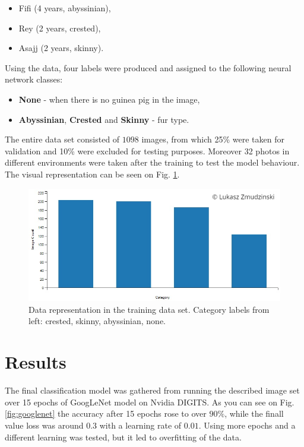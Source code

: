 \documentclass[10pt,journal,compsoc]{IEEEtran}
\begin{document}
    \begin{itemize}
        \item Fifi (4 years, abyssinian),
        \item Rey (2 years, crested),
        \item Asajj (2 years, skinny).
    \end{itemize}

    \noindent Using the data, four labels were produced and assigned to the following neural network classes:

    \begin{itemize}
        \item \textbf{None} - when there is no guinea pig in the image,
        \item \textbf{Abyssinian}, \textbf{Crested} and \textbf{Skinny} - fur type.
    \end{itemize}

    The entire data set consisted of $1098$ images, from which 25\% were taken for validation and 10\% were excluded for testing purposes. Moreover 32 photos in different environments were taken after the training to test the model behaviour. The visual representation can be seen on Fig. \ref{fig:data}.

    \begin{figure}[h]
        \includegraphics[width=\linewidth]{data.png}
        \caption{Data representation in the training data set. Category labels from left: crested, skinny, abyssinian, none.}
        \label{fig:data}
        \centering
    \end{figure}
    
    \section{Results}

    The final classification model was gathered from running the described image set over 15 epochs of GoogLeNet model on Nvidia DIGITS. As you can see on Fig. \ref{fig:googlenet} the accuracy after 15 epochs rose to over $90\%$, while the finall value loss was around $0.3$ with a learning rate of $0.01$. Using more epochs and a different learning was tested, but it led to overfitting of the data.
\end{document}
